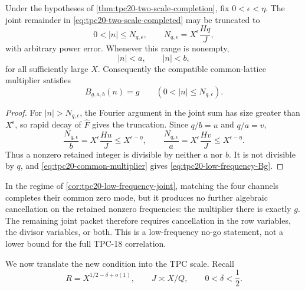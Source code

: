 \begin{corollary}
\label{cor:tpc20-low-frequency-joint}
Under the hypotheses of \cref{thm:tpc20-two-scale-completion}, fix
\(0<\epsilon<\eta\).  The joint remainder in
\eqref{eq:tpc20-two-scale-completed} may be truncated to
\begin{equation}
 0<|n|\le N_{q,\epsilon},
 \qquad
 N_{q,\epsilon}=X^\epsilon\frac{Hq}{J},
 \label{eq:tpc20-dual-length}
\end{equation}
with arbitrary power error.  Whenever this range is nonempty,
\begin{equation}
 |n|<a,\qquad |n|<b,
 \label{eq:tpc20-low-frequency-transverse}
\end{equation}
for all sufficiently large \(X\).  Consequently the compatible
common-lattice multiplier satisfies
\begin{equation}
 B_{g,a,b}(n)=g
 \qquad(0<|n|\le N_{q,\epsilon}).
 \label{eq:tpc20-low-frequency-Bg}
\end{equation}
\end{corollary}

\begin{proof}
For \(|n|>N_{q,\epsilon}\), the Fourier argument in the joint sum has
size greater than \(X^\epsilon\), so rapid decay of \(\widehat F\) gives
the truncation.  Since \(q/b=u\) and \(q/a=v\),
\[
 \frac{N_{q,\epsilon}}b
 =X^\epsilon\frac{Hu}{J}\le X^{\epsilon-\eta},
 \qquad
 \frac{N_{q,\epsilon}}a
 =X^\epsilon\frac{Hv}{J}\le X^{\epsilon-\eta}.
\]
Thus a nonzero retained integer is divisible by neither \(a\) nor \(b\).
It is not divisible by \(q\), and
\eqref{eq:tpc20-common-multiplier} gives
\eqref{eq:tpc20-low-frequency-Bg}.
\end{proof}

\begin{remark}
\label{rem:tpc20-low-frequency-nogo}
In the regime of \cref{cor:tpc20-low-frequency-joint}, matching the four
channels completes their common zero mode, but it produces no further
algebraic cancellation on the retained nonzero frequencies: the multiplier
there is exactly \(g\).  The remaining joint packet therefore requires
cancellation in the row variables, the divisor variables, or both.  This is
a low-frequency no-go statement, not a lower bound for the full TPC-18
correlation.
\end{remark}

We now translate the new condition into the TPC scale.  Recall
\begin{equation}
 R=X^{1/2-\delta+o(1)},\qquad J\asymp X/Q,
 \qquad 0<\delta<\frac12.
 \label{eq:tpc20-RJ-scales}
\end{equation}

